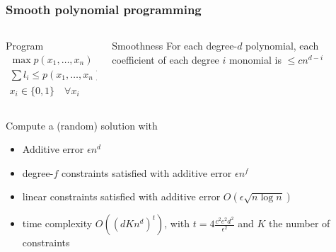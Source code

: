 \documentclass[12pt,aspectratio=169]{beamer}
\begin{document}
\begin{frame}\frametitle{Smooth polynomial programming }
\begin{columns} 
  \begin{column}{0.58\textwidth}
  \begin{block}{Program}
    \begin{equation}
    \begin{split}
      \max p(x_{1}, \ldots, x_{n})\qquad\text{subject to}\\
      \sum l_{i} \le p(x_{1}, \ldots, x_{n}) \le g_{i}\\
      x_{i}\in \{0, 1\}\quad \forall x_{i}
     \end{split}
   \end{equation}
 \end{block}
\end{column}
  \begin{column}{0.38\textwidth}
\begin{block}{Smoothness}
   For each degree-$d$ polynomial, each coefficient of each degree $i$ monomial is $\le c
   n^{d-i}$
 \end{block}
\end{column}
\end{columns}
\begin{block}{Compute a (random) solution with}
   \begin{itemize}
   \item
     Additive error $\epsilon n^{d}$
   \item
     degree-$f$ constraints satisfied with additive error $\epsilon n^{f}$
   \item
     linear constraints satisfied with additive error $O(\epsilon \sqrt{n \log n})$
   \item
     time complexity $O\left(\left(dKn^{d}\right)^{t}\right)$, with
     $t=4\frac{c^{2}e^{2}d^{2}}{\epsilon^{2}}$ and $K$ the number of constraints
   \end{itemize}
 \end{block}
\end{frame}
\end{document}
